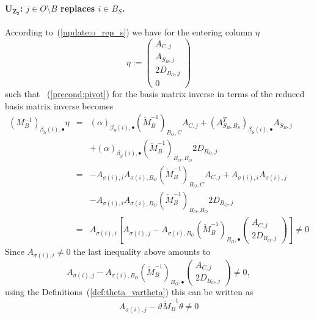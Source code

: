 \documentclass[a4paper]{article}
\begin{document}
\paragraph{$\mathbf{U_{Z_{3}}}$: $j \in O \setminus B$ replaces $i \in B_{S}$.}
According to~(\ref{update:o_rep_s})
we have for the entering column $\eta$
\begin{equation}
\eta:=
\left(
\begin{array}{c}
A_{C, j} \\
\hline
A_{S_{B},j} \\
\hline
2D_{B_{O},j} \\
\hline
0
\end{array}
\right)
\end{equation}
such that ~(\ref{precond:pivot})
for the basis matrix inverse in terms of
the reduced basis matrix inverse becomes
\begin{eqnarray}
\left(M_{B}^{-1}\right)_{\beta_{S}(i), \bullet} \eta
&=&
\left(\alpha\right)_{\beta_{S}(i), \bullet}
\left(\check{M}_{B}^{-1}\right)_{B_{O},C}A_{C,j}
+\left(A_{S_{B}, B_{S}}^{T}\right)_{\beta_{S}(i), \bullet}A_{S_{B},j}
\nonumber \\
&&
+\left(\alpha\right)_{\beta_{S}(i), \bullet}
 \left(\check{M}_{B}^{-1}\right)_{B_{O}, B_{O}}2D_{B_{O},j}
\nonumber \\
&=&
-A_{\sigma(i),i}A_{\sigma(i),B_{O}}
 \left(\check{M}_{B}^{-1}\right)_{B_{O},C}A_{C,j}
+A_{\sigma(i),i}A_{\sigma(i),j}
\nonumber \\
&&
-A_{\sigma(i),i}A_{\sigma(i),B_{O}}
 \left(\check{M}_{B}^{-1}\right)_{B_{O},B_{O}}2D_{B_{O},j}
\nonumber \\
&=&
A_{\sigma(i),i}
\left[
A_{\sigma(i),j} - A_{\sigma(i), B_{O}}
\left(\check{M}_{B}^{-1}\right)_{B_{O}, \bullet}
\left(
\begin{array}{c}
A_{C,j}  \\
\hline
2D_{B_{O}, j}
\end{array}
\right)
\right]
\neq 0
\nonumber
\end{eqnarray}
Since $A_{\sigma(i), i} \neq 0$ the last inequality above amounts to
\begin{equation}
A_{\sigma(i),j} - A_{\sigma(i), B_{O}}
\left(\check{M}_{B}^{-1}\right)_{B_{O}, \bullet}
\left(
\begin{array}{c}
A_{C,j}  \\
\hline
2D_{B_{O}, j}
\end{array}
\right)
\neq
0,
\nonumber
\end{equation}
using the Definitions~(\ref{def:theta_vartheta}) this can be written as
\begin{equation}
A_{\sigma(i),j} -
\vartheta\check{M}_{B}^{-1}\theta \neq 0
\end{equation}
\end{document}
